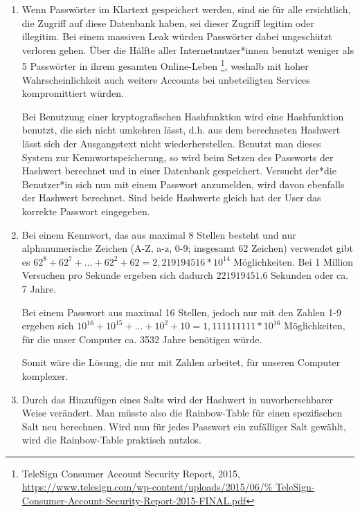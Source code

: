 \documentclass[a4paper,11pt]{scrartcl}
\begin{document}
\begin{enumerate}[2.]
    \item
        Wenn Passwörter im Klartext gespeichert werden, sind sie für alle
        ersichtlich, die Zugriff auf diese Datenbank haben, sei dieser Zugriff
        legitim oder illegitim. Bei einem massiven Leak würden Passwörter
        dabei ungeschützt verloren gehen. Über die Hälfte aller Internetnutzer*innen
        benutzt weniger als 5 Passwörter in ihrem gesamten Online-Leben%
        \footnote{TeleSign Consumer Account Security Report, 2015,\\%
        \url{https://www.telesign.com/wp-content/uploads/2015/06/%
        TeleSign-Consumer-Account-Security-Report-2015-FINAL.pdf}},
        weshalb mit hoher Wahrscheinlichkeit auch weitere Accounts bei unbeteiligten
        Services kompromittiert würden.

        Bei Benutzung einer kryptografischen Hashfunktion wird eine Hashfunktion
        benutzt, die sich nicht umkehren lässt, d.h. aus dem berechneten
        Hashwert lässt sich der Ausgangstext nicht wiederherstellen. Benutzt man
        dieses System zur Kennwortspeicherung, so wird beim Setzen des Passworts
        der Hashwert berechnet und in einer Datenbank gespeichert. Versucht der*die
        Benutzer*in sich nun mit einem Passwort anzumelden, wird davon ebenfalls
        der Hashwert berechnet. Sind beide Hashwerte gleich hat der User das
        korrekte Passwort eingegeben.

    \item 
    	Bei einem Kennwort, das aus maximal 8 Stellen besteht und nur alphanumerische Zeichen (A-Z, a-z, 0-9; insgesamt 62 Zeichen) verwendet gibt es
    	\(62^8 + 62^7 + ... + 62^2 + 62 = 2,219194516*10^{14}\) Möglichkeiten. Bei 1 Million Versuchen pro Sekunde ergeben sich dadurch \(221919451.6\) Sekunden oder ca. 7 Jahre.

    	Bei einem Passwort aus maximal 16 Stellen, jedoch nur mit den Zahlen 1-9 ergeben sich \(10^{16} + 10^{15} + ... + 10^2 + 10 = 1,111111111*10^{16}\) Möglichkeiten,
    	für die unser Computer ca. 3532 Jahre benötigen würde.
    	
    	Somit wäre die Lösung, die nur mit Zahlen arbeitet, für unseren Computer
    	komplexer.



    \item
        Durch das Hinzufügen eines Salts wird der Hashwert in unvorhersehbarer
        Weise verändert. Man müsste also die Rainbow-Table für einen spezifischen
        Salt neu berechnen. Wird nun für jedes Passwort ein zufälliger Salt
        gewählt, wird die Rainbow-Table praktisch nutzlos.


\end{enumerate}
\end{document}
